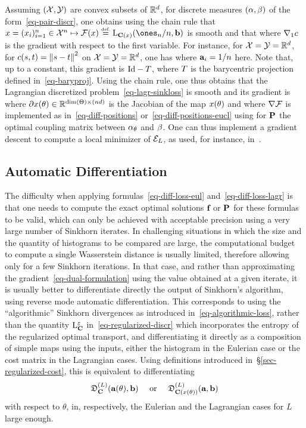 Assuming $(\X,\Y)$ are convex subsets of $\RR^\dim$, for discrete measures $(\al,\be)$ of the form~\eqref{eq-pair-discr}, one obtains using the chain rule that $x = (x_i)_{i=1}^n  \in \X^n \mapsto \Ff(x) \eqdef  \MKD_{\C(x)}(\ones_n/n,\b)$ is smooth and that
where $\nabla_1 \c$ is the gradient with respect to the first variable. 
%
For instance, for $\X=\Y=\RR^d$, for $\c(s,t) = \norm{s-t}^2$ on $\X=\Y=\RR^d$, one has
where $\a_i=1/n$ here.
%
Note that, up to a constant, this gradient is $\Id-\T$, where $\T$ is the barycentric projection defined in~\eqref{eq-baryproj}.
%
Using the chain rule, one thus obtains that the Lagrangian discretized problem~\eqref{eq-lagr-sinkloss} is smooth and its gradient is
where $\partial x(\th) \in \RR^{\text{dim}(\Theta) \times (n\dim)}$ is the Jacobian of the map $x(\th)$ and
where $\nabla \Ff$ is implemented as in~\eqref{eq-diff-positions} or~\eqref{eq-diff-positions-eucl} using for $\P$ the optimal coupling matrix between $\al_\th$ and $\be$.
%
One can thus implement a gradient descent to compute a local minimizer of $\Ee_L$, as used, for instance, in~\citep{CuturiBarycenter}.

\subsection{Automatic Differentiation}
\label{rem-auto-diff}

The difficulty when applying formulas~\eqref{eq-diff-loss-eul} and~\eqref{eq-diff-loss-lagr} is that one needs to compute the exact optimal solutions $\fD$ or $\P$ for these formulas to be valid, which can only be achieved with acceptable precision using a very large number of Sinkhorn iterates.
%
In challenging situations in which the size and the quantity of histograms to be compared are large, the computational budget to compute a single Wasserstein distance is usually limited, therefore allowing only for a few Sinkhorn iterations. In that case, and rather than approximating the gradient~\eqref{eq-dual-formulation} using the value obtained at a given iterate, it is usually better to differentiate directly the output of Sinkhorn's algorithm, using reverse mode automatic differentiation. This corresponds to using the ``algorithmic'' Sinkhorn divergences as introduced in~\eqref{eq-algorithmic-loss}, rather than the quantity $\MKD_\C^\varepsilon$ in~\eqref{eq-regularized-discr} which incorporates the entropy of the regularized optimal transport, and differentiating it directly as a composition of simple maps using the inputs, either the histogram in the Eulerian case or the cost matrix in the Lagrangian cases. Using definitions introduced in~\S\ref{sec-regularized-cost}, this is equivalent to differentiating 
$$\itL{\SINKHORND_{\C}}(\a(\theta),\b) \quad\text{ or }\quad \itL{\SINKHORND_{\C(x(\theta))}}(\a,\b)$$
with respect to $\theta$, in, respectively, the Eulerian and the Lagrangian cases for $L$ large enough.


